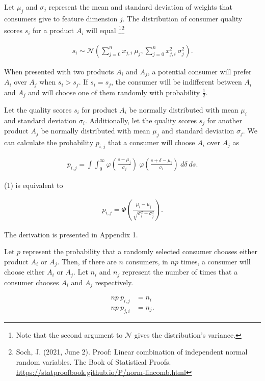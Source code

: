 \documentclass[]{article}
\begin{document}
Let \(\mu_j\) and \(\sigma_j\) represent the mean and standard deviation
of weights that consumers give to feature dimension \(j\). The
distribution of consumer quality scores \(s_i\) for a product \(A_i\)
will equal \footnote{Note that the second argument to \(\mathcal{N}\)
  gives the distribution's variance.}\footnote{Soch, J. (2021, June 2).
  Proof: Linear combination of independent normal random variables. The
  Book of Statistical Proofs.
  \url{https://statproofbook.github.io/P/norm-lincomb.html} }

\begin{align}
s_i \sim \mathcal{N} (\sum_{j=0}^n x_{j,i}\ \mu_j, \sum_{j=0}^n x_{j,i}^2\ \sigma_j^2).
\end{align}

When presented with two products \(A_i\) and \(A_j\), a potential
consumer will prefer \(A_i\) over \(A_j\) when \(s_i > s_j\). If
\(s_i = s_j\), the consumer will be indifferent between \(A_i\) and
\(A_j\) and will choose one of them randomly with probability
\(\frac{1}{2}\).

Let the quality scores \(s_i\) for product \(A_i\) be normally
distributed with mean \(\mu_i\) and standard deviation \(\sigma_i\).
Additionally, let the quality scores \(s_j\) for another product \(A_j\)
be normally distributed with mean \(\mu_j\) and standard deviation
\(\sigma_j\). We can calculate the probability \(p_{i,j}\) that a
consumer will choose \(A_i\) over \(A_j\) as

\begin{align}
p_{i,j} = \int \int_0^{\infty} \varphi(\frac{s - \mu_j}{\sigma_j})\ \varphi (\frac{s + \delta - \mu_i}{\sigma_i})\ d\delta\ ds.
\end{align}

(1) is equivalent to

\begin{align}
p_{i,j} = \Phi (\frac{\mu_i - \mu_j}{\sqrt{\sigma_i^2 + \sigma_j^2}}).
\end{align}

The derivation is presented in Appendix 1.

Let \(p\) represent the probability that a randomly selected consumer
chooses either product \(A_i\) or \(A_j\). Then, if there are \(n\)
consumers, in \(np\) times, a consumer will choose either \(A_i\) or
\(A_j\). Let \(n_i\) and \(n_j\) represent the number of times that a
consumer chooses \(A_i\) and \(A_j\) respectively.

\begin{align*}
np\ p_{i, j} &= n_i\\
np\ p_{j, i} &= n_j.
\end{align*}
\end{document}
